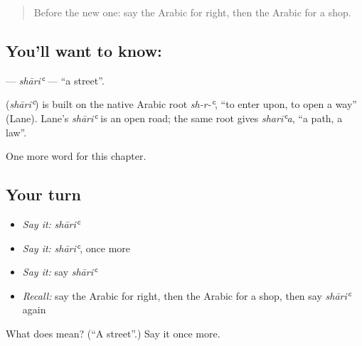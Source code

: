 \label{lesson:AR-C90-shari}



\begin{quote}
Before the new one: say the Arabic for right, then the Arabic for a shop.
\end{quote}

\subsection*{You'll want to know: }
\textbf{} — \emph{shāriʿ} — \textquotedblleft{}a street\textquotedblright{}.

\begin{cousinweb}
\textbf{} (\emph{shāriʿ}) is built on the native Arabic root \emph{sh-r-ʿ}, \textquotedblleft{}to enter upon, to open a way\textquotedblright{} (Lane). Lane's \emph{shāriʿ} is an open road; the same root gives \emph{sharīʿa}, \textquotedblleft{}a path, a law\textquotedblright{}.
\end{cousinweb}

\begin{grammarlens}[title={What you've built}]
One more word for this chapter.
\end{grammarlens}

\subsection*{Your turn}
\begin{itemize}
\raggedright
  \item \emph{Say it:} \emph{shāriʿ}
  \item \emph{Say it:} \emph{shāriʿ}, once more
  \item \emph{Say it:} say \emph{shāriʿ}
  \item \emph{Recall:} say the Arabic for right, then the Arabic for a shop, then say \emph{shāriʿ} again
\end{itemize}

\begin{tcolorbox}[breakable,colback=teal!4,colframe=teal!35!black,title={Before you move on}]
What does  mean? (\textquotedblleft{}A street\textquotedblright{}.) Say it once more.
\end{tcolorbox}
